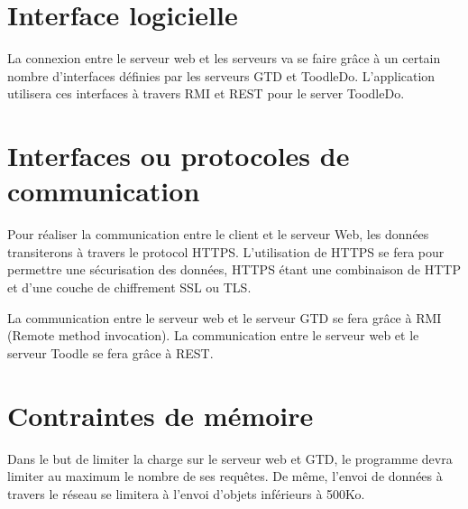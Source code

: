 \section{Interface logicielle}

La connexion entre le serveur web et les serveurs va se faire grâce à un certain nombre d'interfaces définies par les serveurs GTD et ToodleDo. L'application utilisera ces interfaces à travers RMI et REST pour le server ToodleDo.



	\section{Interfaces ou protocoles de communication}

Pour réaliser la communication entre le client et le serveur Web, les données transiterons à travers le protocol HTTPS. L'utilisation de HTTPS se fera pour permettre une sécurisation des données, HTTPS étant une combinaison de HTTP et d'une couche de chiffrement SSL ou TLS.

\medskip

La communication entre le serveur web et le serveur GTD se fera grâce à RMI (Remote method invocation). La communication entre le serveur web et le serveur Toodle se fera grâce à REST.


\section{Contraintes de mémoire}
Dans le but de limiter la charge sur le serveur web et GTD, le programme devra limiter au maximum le nombre de ses requêtes. De même, l'envoi de données à travers le réseau se limitera à l'envoi d'objets inférieurs à 500Ko.




